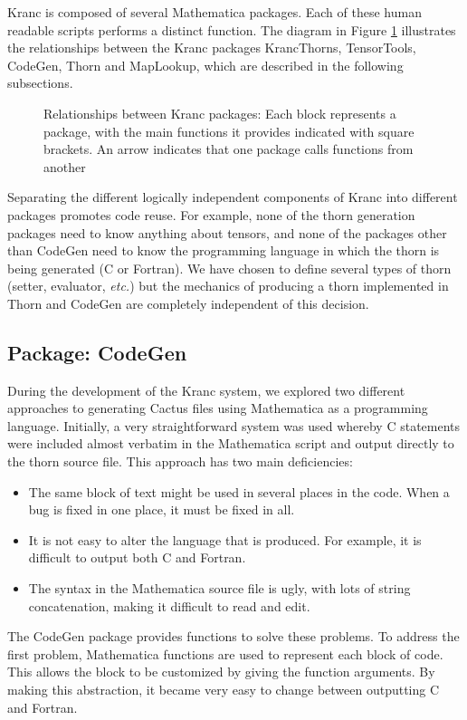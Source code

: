 \documentclass{report}
\begin{document}
Kranc is composed of several Mathematica packages.  Each of these
human readable scripts performs a distinct function.  
The diagram in Figure \ref{fig:kranc_design} illustrates the
relationships between the Kranc packages KrancThorns, TensorTools,
CodeGen, Thorn and MapLookup, which are described in the following
subsections.
\begin{figure}
\centering
\label{fig:kranc_design}
\caption{Relationships between Kranc packages: 
Each block represents a package, with the main functions it provides
indicated with square brackets.  An arrow indicates that one package
calls functions from another}
\end{figure}
Separating the different logically independent components of Kranc
into different packages promotes code reuse.  For example, none of the
thorn generation packages need to know anything about tensors, and
none of the packages other than CodeGen need to know the programming
language in which the thorn is being generated (C or Fortran).  We
have chosen to define several types of thorn (setter, evaluator, {\em
etc.}) but the mechanics of producing a thorn implemented in Thorn and
CodeGen are completely independent of this decision.

\subsection{Package: CodeGen}

During the development of the Kranc system, we explored two different
approaches to generating Cactus files using Mathematica as a
programming language.  Initially, a very straightforward system was
used whereby C statements were included almost verbatim in the
Mathematica script and output directly to the thorn source file.  This
approach has two main deficiencies:
\begin{itemize}
\item{The same block of text might be used in several places in the
code.  When a bug is fixed in one place, it must be fixed in all.}
\item{It is not easy to alter the language that is produced.  For
example, it is difficult to output both C and Fortran.}
\item{The syntax in the Mathematica source file is ugly, with lots of
string concatenation, making it difficult to read and edit}.
\end{itemize}

The CodeGen package provides functions to solve these problems.  To
address the first problem, Mathematica functions are used to represent
each block of code.  This allows the block to be customized by giving
the function arguments.  By making this abstraction, it became very
easy to change between outputting C and Fortran.
\end{document}
